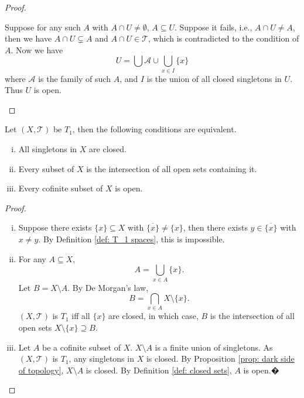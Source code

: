 \begin{corollary}
\begin{proof}
\begin{enumerate}[(i)]
			Suppose for any such $A$ with $A \cap U \ne \emptyset$, $A \subseteq U$. Suppose it fails, i.e., $A \cap U \ne A$, then we have $A \cap U \subsetneq A$ and $A \cap U \in \mathcal T$, which is contradicted to the condition of $A$. Now we have
			$$
			U = \bigcup \mathcal A \cup \bigcup_{x \in I} \{x\}
			$$
			where $\mathcal A$ is the family of such $A$, and $I$ is the union of all closed singletons in $U$. Thus $U$ is open.
		\end{enumerate}
	\end{proof}
\end{corollary}


\begin{corollary}
	\label{prop: alternative definitions of T_1 spaces}
	Let $(X, \mathcal T)$ be $T_1$, then the following conditions are equivalent.
	\begin{enumerate}[(i)]
		\item All singletons in $X$ are closed.
		\item Every subset of $X$ is the intersection of all open sets containing it.
		\item Every cofinite subset of $X$ is open.
	\end{enumerate}


	\begin{proof} \
		\begin{enumerate}[(i)]
			\item
			Suppose there exists $\{x\} \subseteq X$ with $\overline{\{x\}} \ne \{x\}$, then there exists $y \in \overline{\{x\}}$ with $x \ne y$. By Definition \ref{def: T_1 spaces}, this is impossible.

			\item
			For any $A \subseteq X$,
			$$
			A = \bigcup_{x \in A} \{x\}.
			$$
			Let $B = X \setminus A$. By De Morgan's law,
			$$
			B = \bigcap_{x \in A} X \setminus \{x\}.
			$$
			$(X, \mathcal T)$ is $T_1$ iff all $\{x\}$ are closed, in which case, $B$ is the intersection of all open sets $X \setminus \{x\} \supseteq B$.

			\item
			Let $A$ be a cofinite subset of $X$. $X \setminus A$ is a finite union of singletons. As $(X, \mathcal T)$ is $T_1$, any singletons in $X$ is closed. By Proposition \ref{prop: dark side of topology}, $X \setminus A$ is closed. By Definition \ref{def: closed sets}, $A$ is open.�
		\end{enumerate}
	\end{proof}
\end{corollary}


